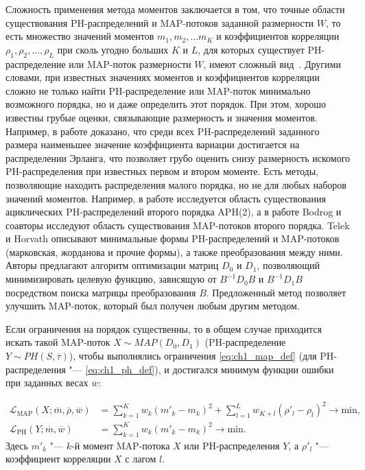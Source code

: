 Сложность применения метода моментов заключается в том, что точные области существования PH-распределений и MAP-потоков заданной размерности $W$, то есть множество значений моментов $m_1, m_2, \dots m_K$ и коэффициентов корреляции $\rho_1, \rho_2, \dots, \rho_L$ при сколь угодно больших $K$ и $L$, для которых существует PH-распределение или MAP-поток размерности $W$, имеют сложный вид~\cite{Bobbio2005,Osogami2006,TelekHorvath2007,Bodrog2008,Bodrog2010}. Другими словами, при известных значениях моментов и коэффициентов корреляции сложно не только найти PH-распределение или MAP-поток минимально возможного порядка, но и даже определить этот порядок. При этом, хорошо известны грубые оценки, связывающие размерность и значения моментов. Например, в работе \cite{Aldous1987} доказано, что среди всех PH-распределений заданного размера наименьшее значение коэффициента вариации достигается на распределении Эрланга, что позволяет грубо оценить снизу размерность искомого PH-распределения при известных первом и втором моменте. Есть методы, позволяющие находить распределения малого порядка, но не для любых наборов значений моментов. Например, в работе \cite{Telek2003} исследуется область существования ациклических PH-распределений второго порядка APH(2), а в работе \cite{Bodrog2010} Bodrog и соавторы исследуют область существования MAP-потоков второго порядка. Telek и Horvath \cite{TelekHorvath2007} описывают минимальные формы PH-распределений и MAP-потоков (марковская, жорданова и прочие формы), а также преобразования между ними. Авторы предлагают алгоритм оптимизации матриц $D_0$ и $D_1$, позволяющий минимизировать целевую функцию, зависящую от $B^{-1}D_{0}B$ и $B^{-1}D_{1}B$ посредством поиска матрицы преобразования $B$. Предложенный метод позволяет улучшить MAP-поток, который был получен любым другим методом.

Если ограничения на порядок существенны, то в общем случае приходится искать такой MAP-поток $X \sim MAP(D_0, D_1)$ (PH-распределение $Y \sim PH(S, \overline{\tau})$), чтобы выполнялись ограничения \eqref{eq:ch1_map_def} (для PH-распределения "--- \eqref{eq:ch1_ph_def}), и достигался минимум функции ошибки при заданных весах $\overline{w}$:

$$
  \begin{aligned}
    \mathcal{L}_{\text{MAP}}(X; \overline{m}, \overline{\rho}, \overline{w}) &=
      \sum\limits_{k=1}^K w_k (m'_k - m_k)^2 +
      \sum\limits_{l=1}^L w_{K+l} (\rho'_l - \rho_l)^2
      \rightarrow \text{min},\\
    \mathcal{L}_{\text{PH}}(Y; \overline{m}, \overline{w}) &=
      \sum\limits_{k=1}^K w_k (m'_k - m_k)^2
      \rightarrow \text{min}.
  \end{aligned}
$$
Здесь $m'_k$ "--- $k$-й момент MAP-потока $X$ или PH-распределения $Y$, а $\rho'_l$ "--- коэффициент корреляции $X$ с лагом $l$.

